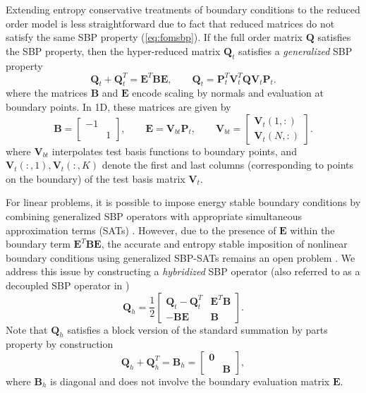 \documentclass[preprint,10pt]{elsarticle}
\theoremstyle{definition}
\theoremstyle{lemma}
\theoremstyle{theorem}
\theoremstyle{assumption}
\begin{document}
Extending entropy conservative treatments of boundary conditions to the reduced order model is less straightforward due to fact that reduced matrices do not satisfy the same SBP property (\ref{eq:fomsbp}).  If the full order matrix $\bm{Q}$ satisfies the SBP property, then the hyper-reduced matrix $\bm{Q}_t$ satisfies a \textit{generalized} SBP property \cite{fernandez2014generalized} 
\[
\bm{Q}_t + \bm{Q}_t^T = \bm{E}^T\bm{B}\bm{E}, \qquad \bm{Q}_t = \bm{P}_t^T\bm{V}_t^T\bm{Q}\bm{V}_t\bm{P}_t.
\]
where the matrices $\bm{B}$ and $\bm{E}$ encode scaling by normals and evaluation at boundary points.  In 1D, these matrices are given by
\[
\bm{B} = \begin{bmatrix}-1 & \\ & 1\end{bmatrix}, \qquad \bm{E} = \bm{V}_{bt}\bm{P}_t, \qquad \bm{V}_{bt} = \begin{bmatrix}\bm{V}_t(1,:) \\ \bm{V}_t(N,:)\end{bmatrix}.
\]
where $\bm{V}_{bt}$ interpolates test basis functions to boundary points, and $\bm{V}_t(:,1), \bm{V}_t(:,K)$ denote the first and last columns (corresponding to points on the boundary) of the test basis matrix $\bm{V}_t$.  

For linear problems, it is possible to impose energy stable boundary conditions by combining generalized SBP operators with appropriate simultaneous approximation terms (SATs) \cite{fernandez2018simultaneous}.  However, due to the presence of $\bm{E}$ within the boundary term $\bm{E}^T\bm{B}\bm{E}$, the accurate and entropy stable imposition of nonlinear boundary conditions using generalized SBP-SATs remains an open problem \cite{crean2018entropy, chan2018efficient, chenreview}. We address this issue by constructing a \textit{hybridized} SBP operator \cite{chan2017discretely, chan2019skew} (also referred to as a decoupled SBP operator in \cite{chan2017discretely})
\[
\bm{Q}_{h} = \frac{1}{2}\begin{bmatrix}
\bm{Q}_t - \bm{Q}_t^T & \bm{E}^T\bm{B} \\
-\bm{B}\bm{E} & \bm{B}
\end{bmatrix}.
\]
Note that $\bm{Q}_h$ satisfies a block version of the standard summation by parts property by construction
\[
\bm{Q}_h + \bm{Q}_h^T = \bm{B}_h = \begin{bmatrix}
\bm{0} & \\
& \bm{B} \end{bmatrix},  
\]
where $\bm{B}_h$ is diagonal and does not involve the boundary evaluation matrix $\bm{E}$.  
\end{document}
